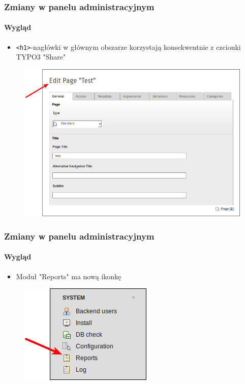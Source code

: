 
\begin{frame}[fragile]
	\frametitle{Zmiany w panelu administracyjnym}
	\framesubtitle{Wygląd}

	\begin{itemize}
		\item \texttt{<h1>}-nagłówki w głównym obszarze korzystają konsekwentnie z czcionki TYPO3 "Share"
	\end{itemize}

	\begin{figure}
		\includegraphics[width=0.6\linewidth]{Images/BackendChanges/ConsistantFont.png}
	\end{figure}

\end{frame}


\begin{frame}[fragile]
	\frametitle{Zmiany w panelu administracyjnym}
	\framesubtitle{Wygląd}

	\begin{itemize}
		\item Moduł "Reports" ma nową ikonkę
	\end{itemize}

	\begin{figure}
		\includegraphics[width=0.35\linewidth]{Images/BackendChanges/ModuleReportsIcon.png}
	\end{figure}

\end{frame}

